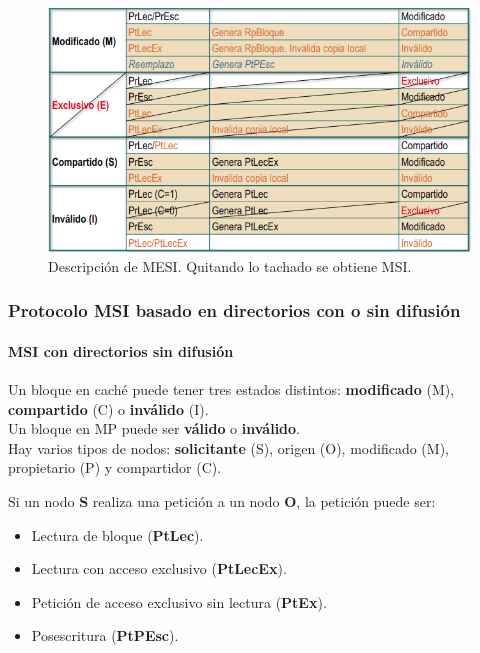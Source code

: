 \documentclass[12pt,spanish]{article}
\begin{document}
\begin{figure}[H]
\centering
\includegraphics[scale=0.75]{mesi.png}
\caption{Descripción de MESI. Quitando lo tachado se obtiene MSI.}
\end{figure}

\subsubsection{Protocolo MSI basado en directorios con o sin difusión}

\paragraph{MSI con directorios sin difusión}

Un bloque en caché puede tener tres estados distintos: \textbf{modificado} (M), \textbf{compartido} (C) o \textbf{inválido} (I).\\

Un bloque en MP puede ser \textbf{válido} o \textbf{inválido}.\\

Hay varios tipos de nodos: \textbf{solicitante} (S), origen (O), modificado (M), propietario (P) y compartidor (C).

Si un nodo \textbf{S} realiza una petición a un nodo \textbf{O}, la petición puede ser:

\begin{itemize}
	\item Lectura de bloque (\textbf{PtLec}).
	\item Lectura con acceso exclusivo (\textbf{PtLecEx}).
	\item Petición de acceso exclusivo sin lectura (\textbf{PtEx}).
	\item Posescritura (\textbf{PtPEsc}).
\end{itemize}
\end{document}
